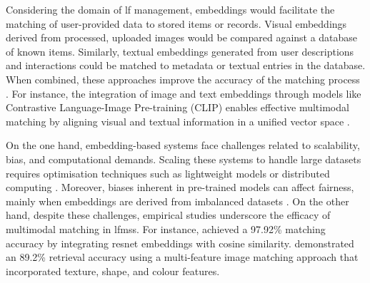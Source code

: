 Considering the domain of \ac{lf} management, embeddings would facilitate the matching of user-provided data to stored items or records. Visual embeddings derived from processed, uploaded images would be compared against a database of known items. Similarly, textual embeddings generated from user descriptions and interactions could be matched to metadata or textual entries in the database. When combined, these approaches improve the accuracy of the matching process \cite{Prawira2024, Radford2021}. For instance, the integration of image and text embeddings through models like Contrastive Language-Image Pre-training (CLIP) enables effective multimodal matching by aligning visual and textual information in a unified vector space \cite{Radford2021}.

On the one hand, embedding-based systems face challenges related to scalability, bias, and computational demands. Scaling these systems to handle large datasets requires optimisation techniques such as lightweight models or distributed computing \cite{Lubna2021}. Moreover, biases inherent in pre-trained models can affect fairness, mainly when embeddings are derived from imbalanced datasets \cite{Prawira2024}. On the other hand, despite these challenges, empirical studies underscore the efficacy of multimodal matching in \acp{lfms}. For instance,  achieved a 97.92\% matching accuracy by integrating \ac{resnet} embeddings with cosine similarity.  demonstrated an 89.2\% retrieval accuracy using a multi-feature image matching approach that incorporated texture, shape, and colour features.
